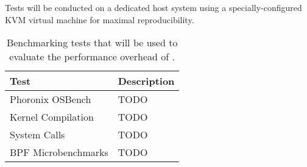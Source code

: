 Tests will be conducted on a dedicated host system using a specially-configured KVM virtual machine for maximal reproducibility.

{
\small
\begin{longtable}[c]{lp{25em}}
  \caption{
    Benchmarking tests that will be used to evaluate the performance overhead of \bpfcontain{}.
  }
  \label{tab:perf_tests}\\
  \toprule
  Test               & Description \\
  \midrule
  \endfirsthead
  Phoronix OSBench    & TODO \\
  Kernel Compilation  & TODO \\
  System Calls        & TODO \\
  BPF Microbenchmarks & TODO \\
  \bottomrule
\end{longtable}
}
